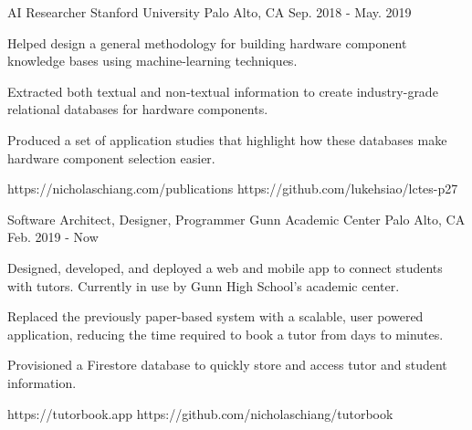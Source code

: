 

\begin{cventries}

  \cvartifact
    {AI Researcher} %
    {Stanford University} %
    {Palo Alto, CA} %
    {Sep. 2018 - May. 2019} %
    {
      \begin{cvitems} %
        \item {Helped design a general methodology for building hardware
		component knowledge bases using machine-learning techniques.}
	\item {Extracted both textual and non-textual information to create
		industry-grade relational databases for hardware components.}
	\item {Produced a set of application studies that highlight how
		these databases make hardware component selection easier.}
      \end{cvitems}
    }
    {https://nicholaschiang.com/publications} %
    {https://github.com/lukehsiao/lctes-p27} %

  \cvartifact
    {Software Architect, Designer, Programmer} %
    {Gunn Academic Center} %
    {Palo Alto, CA} %
    {Feb. 2019 - Now} %
    {
      \begin{cvitems} %
        \item {Designed, developed, and deployed a web and mobile app to connect
		students with tutors. Currently in use by Gunn High School's
		academic center.}
        \item {Replaced the previously paper-based system with a scalable,
		user powered application, reducing the time required to book a
		tutor from days to minutes.}
        \item {Provisioned a Firestore database to quickly store and access
		tutor and student information.}
      \end{cvitems}
    }
    {https://tutorbook.app} %
    {https://github.com/nicholaschiang/tutorbook} %


\end{cventries}
